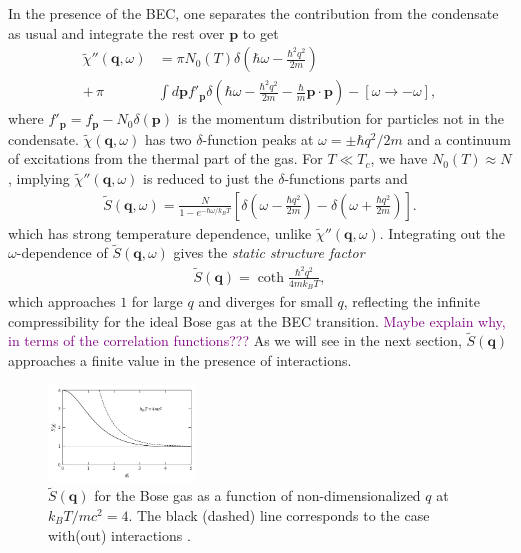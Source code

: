 \documentclass[reprint,
nofootinbib,
amsmath,amssymb,
aps]{revtex4-1}
\newcommand{\f}[2]{\frac{#1}{#2}}
\newcommand{\lp}{\left(}
\newcommand{\rp}{\right)}
\newcommand{\lb}{\left[}
\newcommand{\rb}{\right]}
\begin{document}
In the presence of the BEC, one separates the contribution from the condensate as usual and integrate the rest over $\mathbf{p}$ to get
\begin{align*}
\widetilde{\chi}''(\mathbf{q},\omega) &= \pi  N_0(T) \delta \lp \hbar \omega - \f{\hbar^2 q^2}{2m} \rp  \\
 + \, \pi &\int d\mathbf{p} f'_\mathbf{p} \delta \lp \hbar \omega - \f{\hbar^2 q^2}{2m} - \f{\hbar}{m} \mathbf{p}\cdot \mathbf{p} \rp - [\omega \to -\omega], 
\end{align*}
where $f'_\mathbf{p} = f_\mathbf{p} - N_0 \delta(\mathbf{p})$ is the momentum distribution for particles not in the condensate. $\widetilde{\chi}(\mathbf{q},\omega)$ has two $\delta$-function peaks at $\omega = \pm \hbar q^2/2m$ and a continuum of excitations from the thermal part of the gas. For $T \ll T_c$, we have $N_0(T) \approx N$, implying $\widetilde{\chi}''(\mathbf{q},\omega)$ is reduced to just the $\delta$-functions parts and  
\begin{align*}
\widetilde{S}(\mathbf{q},\omega) = \f{N}{1 - e^{-\hbar \omega / k_BT}} \lb \delta\lp \omega - \f{\hbar q^2}{2m} \rp - \delta \lp  \omega + \f{\hbar q^2}{2m} \rp \rb.
\end{align*}
which has strong temperature dependence, unlike $\widetilde{\chi}''(\mathbf{q},\omega)$.  Integrating out the $\omega$-dependence of $\widetilde{S}(\mathbf{q},\omega)$ gives the \textit{static structure factor}
\begin{align*}
\widetilde{S}(\mathbf{q}) = \coth \f{\hbar^2 q^2}{4mk_BT},
\end{align*}
which approaches $1$ for large $q$ and diverges for small $q$, reflecting the infinite compressibility for the ideal Bose gas at the BEC transition. \textcolor{purple}{Maybe explain why, in terms of the correlation functions???} As we will see in the next section, $\widetilde{S}(\mathbf{q})$ approaches a finite value in the presence of interactions. 

\begin{figure}[!htb]
\label{fig:ideal}
\centering
\includegraphics[width=0.35\textwidth]{figures/ideal.png}
\caption{$\widetilde{S}(\mathbf{q})$ for the Bose gas as a function of non-dimensionalized $q$ at $k_BT / mc^2 = 4$. The black (dashed) line corresponds to the case with(out) interactions \cite{pitaevskii2016bose}.}
\end{figure}
\end{document}
